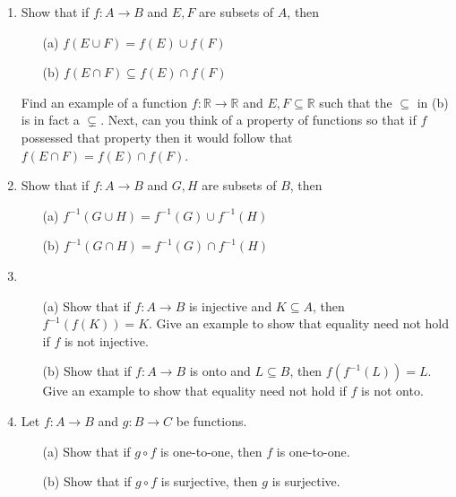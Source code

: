 \documentclass[12pt]{article}
\begin{document}
\begin{enumerate}
\newpage
    
    \item Show that if $f:A \to B$ and $E, F$ are subsets of $A$, then
    \begin{itemize}
        \item[(a)] $f(E \cup F) = f(E) \cup f(F)$
        \item[(b)] $f(E \cap F) \subseteq f(E) \cap f(F)$
    \end{itemize}    
    Find an example of a function $f: \mathbb{R} \to \mathbb{R}$ and $E, F \subseteq \mathbb{R}$ such that the $\subseteq$ in (b) is in fact a $\subsetneq$. Next, can you think of a property of functions so that if $f$ possessed that property then it would follow that $f(E \cap F) = f(E) \cap f(F)$.

    \item Show that if $f:A \to B$ and $G, H$ are subsets of $B$, then
    \begin{itemize}
        \item[(a)] $f^{-1}(G \cup H) = f^{-1}(G) \cup f^{-1}(H)$
        \item[(b)] $f^{-1}(G \cap H) = f^{-1}(G) \cap f^{-1}(H)$
    \end{itemize}  

    \item 
    \begin{itemize}
        \item[(a)] Show that if $f : A \to B$ is injective and $K \subseteq A$, then $f^{-1}(f(K))=K$. Give an example to show that equality need not hold if $f$ is not injective.
        \item[(b)]  Show that if $f : A \to B$ is onto and $L \subseteq B$, then $f(f^{-1}(L))=L$. Give an example to show that equality need not hold if $f$ is not onto.
    \end{itemize}
        
    \item Let $f : A \to B$ and $g : B \to C$ be functions.
    \begin{itemize}
        \item[(a)] Show that if $g \circ f$ is one-to-one, then $f$ is one-to-one.
        \item[(b)] Show that if $g \circ f$ is surjective, then $g$ is surjective.
    \end{itemize}


\end{enumerate}
\end{document}

